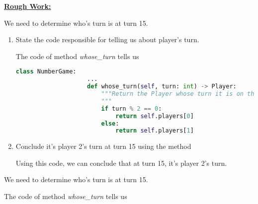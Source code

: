 \documentclass[12pt]{article}
\begin{document}
\begin{enumerate}[1.]
    \bigskip

    \begin{mdframed}
        \underline{\textbf{Rough Work:}}

        \bigskip

        We need to determine who's turn is at turn 15.

        \bigskip

        \begin{enumerate}[1.]
            \item State the code responsible for telling us about player's turn.

            \bigskip

            \begin{mdframed}

                The code of method \textit{whose\_turn} tells us

                \begin{lstlisting}[language=Python]
                class NumberGame:
                    ...
                    def whose_turn(self, turn: int) -> Player:
                        """Return the Player whose turn it is on the given turn number.
                        """
                        if turn % 2 == 0:
                            return self.players[0]
                        else:
                            return self.players[1]
                \end{lstlisting}

            \end{mdframed}

            \bigskip

            \item Conclude it's player 2's turn at turn 15 using the method

            \bigskip

            \begin{mdframed}

            Using this code, we can conclude that at turn 15, it's player 2's turn.
            \end{mdframed}
        \end{enumerate}

        \begin{mdframed}
            We need to determine who's turn is at turn 15.

            \bigskip

            The code of method \textit{whose\_turn} tells us


\end{mdframed}
\end{mdframed}
\end{enumerate}
\end{document}
